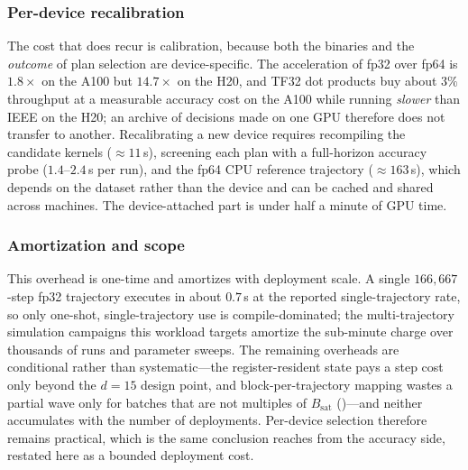 \subsubsection{Per-device recalibration}
The cost that does recur is calibration, because both the binaries and the \emph{outcome} of plan selection are device-specific. The acceleration of fp32 over fp64 is $1.8\times$ on the A100 but $14.7\times$ on the H20, and TF32 dot products buy about $3\%$ throughput at a measurable accuracy cost on the A100 while running \emph{slower} than IEEE on the H20; an archive of decisions made on one GPU therefore does not transfer to another. Recalibrating a new device requires recompiling the candidate kernels ($\approx11$\,s), screening each plan with a full-horizon accuracy probe ($1.4$--$2.4$\,s per run), and the fp64 CPU reference trajectory ($\approx163$\,s), which depends on the dataset rather than the device and can be cached and shared across machines. The device-attached part is under half a minute of GPU time.

\subsubsection{Amortization and scope}
This overhead is one-time and amortizes with deployment scale. A single $166{,}667$-step fp32 trajectory executes in about $0.7$\,s at the reported single-trajectory rate, so only one-shot, single-trajectory use is compile-dominated; the multi-trajectory simulation campaigns this workload targets amortize the sub-minute charge over thousands of runs and parameter sweeps. The remaining overheads are conditional rather than systematic---the register-resident state pays a step cost only beyond the $d{=}15$ design point, and block-per-trajectory mapping wastes a partial wave only for batches that are not multiples of $B_{\mathrm{sat}}$ ()---and neither accumulates with the number of deployments. Per-device selection therefore remains practical, which is the same conclusion  reaches from the accuracy side, restated here as a bounded deployment cost.

